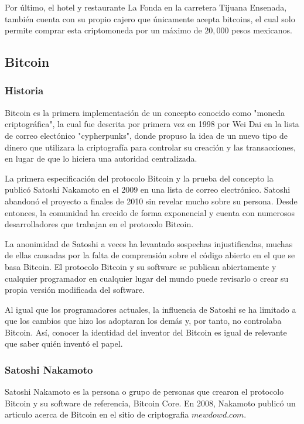 \documentclass[12pt,letterpaper]{article}
\begin{document}
Por \'ultimo, el hotel y restaurante La Fonda en la carretera Tijuana Ensenada, tambi\'en cuenta con su propio cajero que \'unicamente acepta bitcoins, el cual solo permite comprar esta criptomoneda por un m\'aximo de $20,000$ pesos mexicanos.
	\subsection*{Bitcoin}
        \subsubsection*{Historia}
Bitcoin es la primera implementaci\'on de un concepto conocido como "moneda criptogr\'afica", la cual fue descrita por primera vez en 1998 por Wei Dai en la lista de correo elect\'onico "cypherpunks", donde propuso la idea de un nuevo tipo de dinero que utilizara la criptograf\'ia para controlar su creaci\'on y las transacciones, en lugar de que lo hiciera una autoridad centralizada.

 La primera especificaci\'on del protocolo Bitcoin y la prueba del concepto la public\'o Satoshi Nakamoto en el 2009 en una lista de correo electr\'onico. Satoshi abandon\'o el proyecto a finales de 2010 sin revelar mucho sobre su persona. Desde entonces, la comunidad ha crecido de forma exponencial y cuenta con numerosos desarrolladores que trabajan en el protocolo Bitcoin.

La anonimidad de Satoshi a veces ha levantado sospechas injustificadas, muchas de ellas causadas por la falta de comprensi\'on sobre el c\'odigo abierto en el que se basa Bitcoin. El protocolo Bitcoin y su software se publican abiertamente y cualquier programador en cualquier lugar del mundo puede revisarlo o crear su propia versi\'on modificada del software. 

Al igual que los programadores actuales, la influencia de Satoshi se ha limitado a que los cambios que hizo los adoptaran los dem\'as y, por tanto, no controlaba Bitcoin. As\'i, conocer la identidad del inventor del Bitcoin es igual de relevante que saber qui\'en invent\'o el papel.
            
                \subsubsection*{Satoshi Nakamoto}
Satoshi Nakamoto es la persona o grupo de personas que crearon el protocolo Bitcoin y su software de referencia, Bitcoin Core. 
En 2008, Nakamoto public\'o un articulo acerca de Bitcoin en el sitio de criptografia $mewdowd.com$. 
\end{document}

